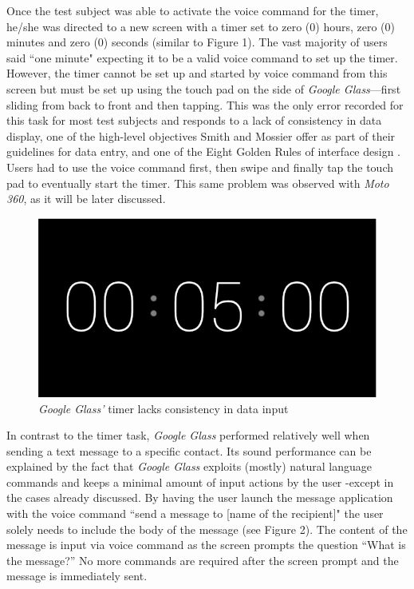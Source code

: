 \documentclass[11pt,a4paper]{scrartcl}
\begin{document}
Once the test subject was able to activate the voice command for the timer, he/she was directed to a new screen with a timer set to zero (0) hours, zero (0) minutes and zero (0) seconds (similar to  Figure 1). The vast majority of users said ``one minute" expecting it to be a valid voice command to set up the timer. However, the timer cannot be set up and started by voice command from this screen but must be set up using the touch pad on the side of \textit{Google Glass}---first sliding from back to front and then tapping. This was the only error recorded for this task for most test subjects and responds to a lack of consistency in data display, one of the high-level objectives Smith and Mossier offer as part of their guidelines for data entry, and one of the Eight Golden Rules of interface design \cite{plaisant09}. Users had to use the voice command first, then swipe and finally tap the touch pad to eventually start the timer. This same problem was observed with \textit{Moto 360}, as it will be later discussed. %

\begin{figure}[h]
\centering
\includegraphics[width=3 in]{glass_timer.png}
\caption{\textit{Google Glass'} timer lacks consistency in data input}
\end{figure}


In contrast to the timer task, \textit{Google Glass} performed relatively well when sending a text message to a specific contact. Its sound performance can be explained by the fact that \textit{Google Glass} exploits (mostly) natural language commands and keeps a minimal amount of input actions by the user -except in the cases already discussed. By having the user launch the message application with the voice command ``send a message to [name of the recipient]" the user solely needs to include the body of the message (see Figure 2). The content of the message is input via voice command as the screen prompts the question ``What is the message?” No more commands are required after the screen prompt and the message is immediately sent.
\end{document}
